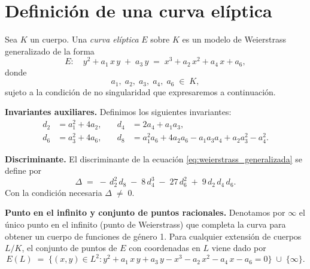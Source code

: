 \section{Definición de una curva elíptica}\label{sec:definicion_curvas_elipticas}
\begin{definicion}\label{def:definicion_curvas_elipticas}
Sea $K$ un cuerpo. Una \emph{curva elíptica} $E$ sobre $K$ es un modelo de Weierstrass generalizado de la forma
\begin{equation}\label{eq:weierstrass_generalizada}
  E:\quad y^2 + a_1\,x\,y \;+\; a_3\,y \;=\; x^3 + a_2\,x^2 + a_4\,x + a_6,
\end{equation}
donde
\[
a_1,\;a_2,\;a_3,\;a_4,\;a_6 \;\in\; K,
\]
sujeto a la condición de no singularidad que expresaremos a continuación.

\medskip

\noindent\textbf{Invariantes auxiliares.} Definimos los siguientes invariantes:
\[
\begin{aligned}
  d_2 &= a_1^2 + 4a_2, &\quad
  d_4 &= 2a_4 + a_1 a_3,\\
  d_6 &= a_3^2 + 4a_6, &\quad
  d_8 &= a_1^2 a_6 + 4a_2 a_6 - a_1 a_3 a_4 + a_2 a_3^2 - a_4^2.
\end{aligned}
\]

\medskip

\noindent\textbf{Discriminante.} El discriminante de la ecuación \eqref{eq:weierstrass_generalizada} se define por
\[
  \Delta \;=\;-\,d_2^2\,d_8 \;-\; 8\,d_4^3 \;-\; 27\,d_6^2 \;+\; 9\,d_2\,d_4\,d_6.
\]
Con la condición necesaria $\Delta \;\neq\; 0$.

\medskip

\noindent\textbf{Punto en el infinito y conjunto de puntos racionales.}  
Denotamos por $\infty$ el único punto en el infinito (punto de Weierstrass) que completa la curva para obtener un cuerpo de funciones de género 1. Para cualquier extensión de cuerpos $L/K$, el conjunto de puntos de $E$ con coordenadas en $L$ viene dado por
\[
  E(L) \;=\; \bigl\{(x,y)\in L^2 : y^2 + a_1\,x\,y + a_3\,y - x^3 - a_2\,x^2 - a_4\,x - a_6 = 0 \bigr\}
  \;\cup\;\{\infty\}.
\]
\end{definicion}


